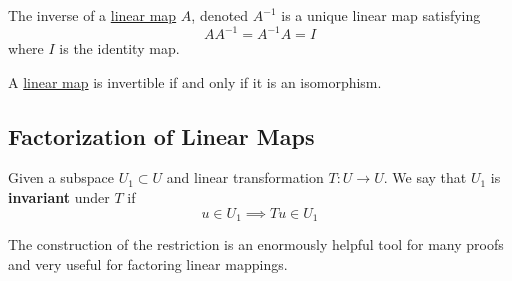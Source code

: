   \begin{definition}[Inverse]
    \label{def:inverse}
    The inverse of a \hyperref[def:linear_map]{linear map} $A$, denoted $A^{-1}$ is a unique linear map satisfying 
    \begin{equation}
      A A^{-1} = A^{-1} A = I
    \end{equation}
    where $I$ is the identity map. 
  \end{definition}

  \begin{corollary}
    \label{thm:invertible-linear-maps-are-isomorphisms}
    A \hyperref[def:linear_map]{linear map} is invertible if and only if it is an isomorphism. 
  \end{corollary} 

\subsection{Factorization of Linear Maps}

	\begin{definition}
	  \label{def:invariant-subspace-under-linear-map}
    Given a subspace $U_1 \subset U$ and linear transformation $T: U \to U$. We say that $U_1$ is \textbf{invariant} under $T$ if 
    \begin{equation}
      u \in U_1 \implies T u \in U_1
    \end{equation}
  \end{definition}

  The construction of the restriction is an enormously helpful tool for many proofs and very useful for factoring linear mappings. 

